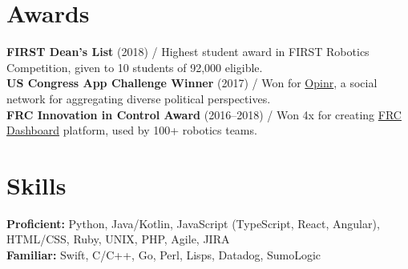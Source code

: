 \documentclass[10pt, a4paper]{article}
\newcommand{\years}[1]{\marginnote{\scriptsize #1}}
\begin{document}
\section*{Awards}
\textbf{FIRST Dean's List} (2018) / Highest student award in FIRST Robotics Competition, given to 10 students of 92,000 eligible.\\
\textbf{US Congress App Challenge Winner} (2017) / Won for \href{http://opinr.me}{Opinr}, a social network for aggregating diverse political perspectives.\\
\textbf{FRC Innovation in Control Award} (2016--2018) / Won 4x for creating \href{https://frcdashboard.github.io}{FRC Dashboard} platform, used by 100+ robotics teams.\\

\vspace{-7mm}
\section*{Skills}
\textbf{Proficient:} Python, Java/Kotlin, JavaScript (TypeScript, React, Angular), HTML/CSS, Ruby, UNIX, PHP, Agile, JIRA\\
\textbf{Familiar:} Swift, C/C++, Go, Perl, Lisps, Datadog, SumoLogic\\
\end{document}
